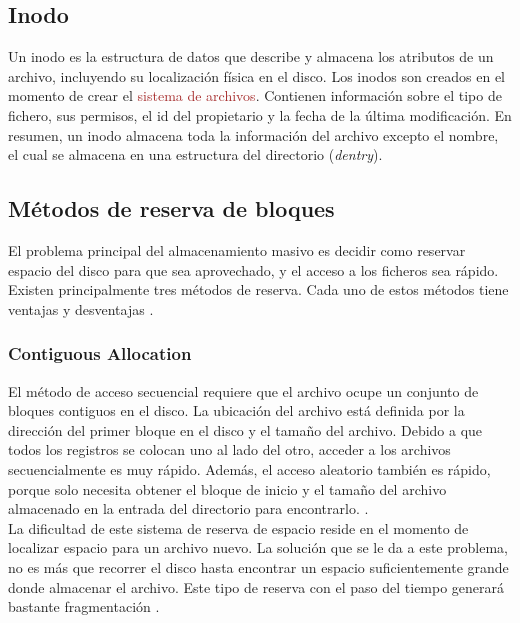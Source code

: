 \subsection{Inodo}
Un inodo es la estructura de datos que describe y almacena los atributos de un archivo, incluyendo su localización física en el disco. Los inodos son creados en el momento de crear el \textcolor{brown}{sistema de archivos}. Contienen información sobre  el tipo de fichero, sus permisos, el id del propietario y la fecha de la última modificación. En resumen, un inodo almacena toda la información del archivo excepto el nombre, el cual se almacena en una estructura del directorio (\textit{dentry}).

\subsection{Métodos de reserva de bloques}
El problema principal del almacenamiento masivo es decidir como reservar espacio del disco para que sea aprovechado, y el acceso a los ficheros sea rápido. Existen principalmente tres métodos de reserva. Cada uno de estos métodos tiene ventajas y desventajas \cite{silberchatz}.


\subsubsection{Contiguous Allocation}
El método de acceso secuencial requiere que el archivo ocupe un conjunto de bloques contiguos en el disco. La ubicación del archivo está definida por la dirección del primer bloque en el disco y el tamaño del archivo. Debido a que todos los registros se colocan uno al lado del otro, acceder a los archivos secuencialmente es muy rápido. Además, el acceso aleatorio también es rápido, porque solo necesita obtener el bloque de inicio y el tamaño del archivo almacenado en la entrada del directorio para encontrarlo. \cite{silberchatz}.\\ 

\newpage
La dificultad de este sistema de reserva de espacio reside en el momento de localizar espacio para un archivo nuevo. La solución que se le da a este problema, no es más que recorrer el disco hasta encontrar un espacio suficientemente grande donde almacenar el archivo. Este tipo de reserva con el paso del tiempo generará bastante fragmentación \cite{silberchatz}.

